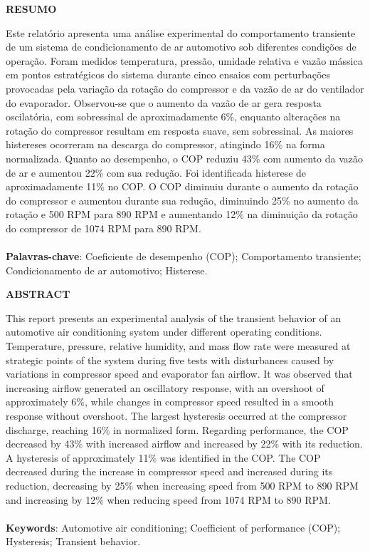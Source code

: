 \onehalfspacing  %
\begin{center}
    \textbf{RESUMO}
\end{center}

{\noindent Este relatório apresenta uma análise experimental do comportamento transiente de um sistema de condicionamento de ar automotivo sob diferentes condições de operação. Foram medidos temperatura, pressão, umidade relativa e vazão mássica em pontos estratégicos do sistema durante cinco ensaios com perturbações provocadas pela variação da rotação do compressor e da vazão de ar do ventilador do evaporador. Observou-se que o aumento da vazão de ar gera resposta oscilatória, com sobressinal de aproximadamente 6\%, enquanto alterações na rotação do compressor resultam em resposta suave, sem sobressinal. As maiores histereses ocorreram na descarga do compressor, atingindo 16\% na forma normalizada. Quanto ao desempenho, o COP reduziu 43\% com aumento da vazão de ar e aumentou 22\% com sua redução. Foi identificada histerese de aproximadamente 11\% no COP. O COP diminuiu durante o aumento da rotação do compressor e aumentou durante sua redução, diminuindo 25\% no aumento da rotação e 500 RPM para 890 RPM e aumentando 12\% na diminuição da rotação do compressor de 1074 RPM para 890 RPM.
\\\\
\noindent \textbf{Palavras-chave}: Coeficiente de desempenho (COP); Comportamento transiente; Condicionamento de ar automotivo; Histerese. 
}
\newpage

\begin{center}
    \textbf{ABSTRACT}
\end{center}

{\noindent This report presents an experimental analysis of the transient behavior of an automotive air conditioning system under different operating conditions. Temperature, pressure, relative humidity, and mass flow rate were measured at strategic points of the system during five tests with disturbances caused by variations in compressor speed and evaporator fan airflow. It was observed that increasing airflow generated an oscillatory response, with an overshoot of approximately 6\%, while changes in compressor speed resulted in a smooth response without overshoot. The largest hysteresis occurred at the compressor discharge, reaching 16\% in normalized form. Regarding performance, the COP decreased by 43\% with increased airflow and increased by 22\% with its reduction. A hysteresis of approximately 11\% was identified in the COP. The COP decreased during the increase in compressor speed and increased during its reduction, decreasing by 25\% when increasing speed from 500 RPM to 890 RPM and increasing by 12\% when reducing speed from 1074 RPM to 890 RPM.
\\\\
\noindent \textbf{Keywords}: Automotive air conditioning; Coefficient of performance (COP); Hysteresis; Transient behavior.
}

\onehalfspacing